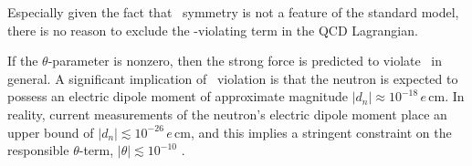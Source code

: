 Especially given the fact that \CP\ symmetry is not a feature of the standard model, there is no reason to exclude the \CP-violating term in the QCD Lagrangian.


If the $\theta$-parameter is nonzero, then the strong force is predicted to violate \CP\ in general.
A significant implication of \CP\ violation is that the neutron is expected to possess an electric dipole moment of approximate magnitude $|d_n| \approx 10^{-18} \,e\,\mathrm{cm}$.
In reality, current measurements \cite{electric_dipole_neutron_2020} of the neutron's electric dipole moment place an upper bound of $|d_n| \lesssim 10^{-26} \,e\,\mathrm{cm}$, and this implies a stringent constraint on the responsible $\theta$-term, $|\theta| \lesssim 10^{-10}$ \cite{Review_2018}.

